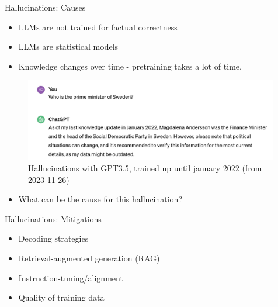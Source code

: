 \documentclass[10pt]{beamer}
\begin{document}
\begin{frame}{Hallucinations: Causes}
\begin{itemize}
\item LLMs are not trained for factual correctness
\item LLMs are statistical models
\item Knowledge changes over time - pretraining takes a lot of time. %
\end{itemize}
\pause
\begin{figure}[h]
\centering
\includegraphics[width=0.99\textwidth]{fig/hall2_gpt35}
\caption{Hallucinations with GPT3.5, trained up until january 2022 (from 2023-11-26)}
\end{figure}
\begin{itemize}
\item What can be the cause for this hallucination?
\end{itemize}

\end{frame}

\begin{frame}{Hallucinations: Mitigations}
\begin{itemize}
\item Decoding strategies %
\item Retrieval-augmented generation (RAG) %
\item Instruction-tuning/alignment
\item Quality of training data
\end{itemize}

\end{frame}
\end{document}
